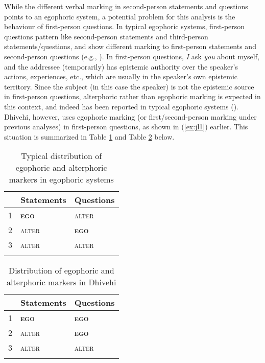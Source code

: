 \documentclass[output=paper]{langsci/langscibook}
\begin{document}
While the different verbal marking in second-person statements and questions points to an egophoric system, a potential problem for this analysis is the behaviour of first-person questions. In typical egophoric systems, first-person questions pattern like second-person statements and third-person statements/questions, and show different marking to first-person statements and second-person questions (e.g., \citealt{Hale1980}). In first-person questions, \textit{I} ask \textit{you} about myself, and the addressee (temporarily) has epistemic authority over the speaker’s actions, experiences, etc., which are usually in the speaker’s own epistemic territory. Since the subject (in this case the speaker) is not the epistemic source in first-person questions, alterphoric rather than egophoric marking is expected in this context, and indeed has been reported in typical egophoric systems (\citealt[4--5]{SanRoque2018}). Dhivehi, however, uses egophoric marking (or first/second-person marking under previous analyses) in first-person questions, as shown in (\ref{ex:jl1}) earlier. This situation is summarized in Table \ref{tab:jl5} and Table \ref{tab:jl6} below.
 
\begin{table}
\begin{tabularx}{.5\textwidth}{lXX}
\lsptoprule
 & \textbf{	Statements}	& \textbf{Questions}\\
\midrule
1	&	\textbf{\textsc{	ego	}}	&	\textsc{	alter	}	\\
2	&	\textsc{	alter	}	&	\textbf{\textsc{	ego	}}	\\
3	&	\textsc{	alter	}	&	\textsc{	alter	}	\\
\lspbottomrule
\end{tabularx}
\caption{Typical distribution of egophoric and alterphoric markers in egophoric systems}
\label{tab:jl5}	
\end{table}
 
\begin{table}
\begin{tabularx}{.5\textwidth}{lXX}
\lsptoprule
 & \textbf{	Statements}	& \textbf{Questions}\\
\midrule
1	&	\textbf{\textsc{	ego	}}	&	\textbf{\textsc{	ego	}}	\\
2	&	\textsc{	alter	}	&	\textbf{\textsc{	ego	}}	\\
3	&	\textsc{	alter	}	&	\textsc{	alter	}	\\
\lspbottomrule
\end{tabularx}
\caption{Distribution of egophoric and alterphoric markers in Dhivehi}
\label{tab:jl6}	
\end{table}
 
\end{document}
